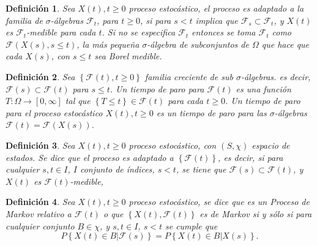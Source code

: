 \documentclass{article}
\newtheorem{Def}{Definición}[section]
\numberwithin{equation}{section}
\begin{document}
\begin{Def}\label{Def.Proc.Adaptado}
Sea $X\left(t\right),t\geq0$ proceso estoc\'astico, el proceso es adaptado a la familia de $\sigma$-\'algebras $\mathcal{F}_{t}$, para $t\geq0$, si para $s<t$ implica que $\mathcal{F}_{s}\subset\mathcal{F}_{t}$, y $X\left(t\right)$ es $\mathcal{F}_{t}$-medible para cada $t$. Si no se especifica $\mathcal{F}_{t}$ entonces se toma $\mathcal{F}_{t}$ como $\mathcal{F}\left(X\left(s\right),s\leq t\right)$, la m\'as peque\~na $\sigma$-\'algebra de subconjuntos de $\Omega$ que hace que cada $X\left(s\right)$, con $s\leq t$ sea Borel medible.
\end{Def}


\begin{Def}\label{Def.Tiempo.Paro}
Sea $\left\{\mathcal{F}\left(t\right),t\geq0\right\}$ familia creciente de sub $\sigma$-\'algebras. es decir, $\mathcal{F}\left(s\right)\subset\mathcal{F}\left(t\right)$ para $s\leq t$. Un tiempo de paro para $\mathcal{F}\left(t\right)$ es una funci\'on $T:\Omega\rightarrow\left[0,\infty\right]$ tal que $\left\{T\leq t\right\}\in\mathcal{F}\left(t\right)$ para cada $t\geq0$. Un tiempo de paro para el proceso estoc\'astico $X\left(t\right),t\geq0$ es un tiempo de paro para las $\sigma$-\'algebras $\mathcal{F}\left(t\right)=\mathcal{F}\left(X\left(s\right)\right)$.
\end{Def}

\begin{Def}
Sea $X\left(t\right),t\geq0$ proceso estoc\'astico, con $\left(S,\chi\right)$ espacio de estados. Se dice que el proceso es adaptado a $\left\{\mathcal{F}\left(t\right)\right\}$, es decir, si para cualquier $s,t\in I$, $I$ conjunto de \'indices, $s<t$, se tiene que $\mathcal{F}\left(s\right)\subset\mathcal{F}\left(t\right)$, y $X\left(t\right)$ es $\mathcal{F}\left(t\right)$-medible,
\end{Def}

\begin{Def}
Sea $X\left(t\right),t\geq0$ proceso estoc\'astico, se dice que es un Proceso de Markov relativo a $\mathcal{F}\left(t\right)$ o que $\left\{X\left(t\right),\mathcal{F}\left(t\right)\right\}$ es de Markov si y s\'olo si para cualquier conjunto $B\in\chi$,  y $s,t\in I$, $s<t$ se cumple que
\begin{equation}\label{Prop.Markov}
P\left\{X\left(t\right)\in B|\mathcal{F}\left(s\right)\right\}=P\left\{X\left(t\right)\in B|X\left(s\right)\right\}.
\end{equation}
\end{Def}
\end{document}

